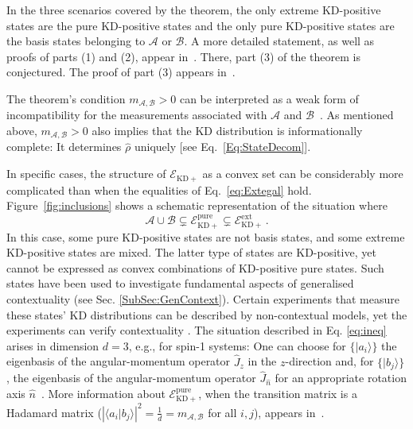 \documentclass[%
 reprint,
superscriptaddress,
nofootinbib,
bibnotes,
 amsmath,amssymb,
 aps,
]{revtex4-1}
\theoremstyle{plain}
\newcommand{\bracket}[2]{\langle #1|#2\rangle}
\newcommand{\Acal}{{\mathcal A}}
\newcommand{\Bcal}{{\mathcal B}}
\newcommand{\EcalKDC}{{\mathcal E}_{\mathrm{KD+}}}
\newcommand{\EcalKDCpu}{{\mathcal E}_{\mathrm{KD+}}^{\mathrm{pure}}}
\newcommand{\EcalKDCext}{{\mathcal E}_{\mathrm{KD+}}^{\mathrm{ext}}}
\newcommand{\mab}{m_{\Acal,\Bcal}}
\begin{document}
In the three scenarios covered by the theorem, the only extreme KD-positive states are the pure KD-positive states and the only pure KD-positive states are the basis states belonging to $\Acal$ or $\Bcal$.  A more detailed statement, as well as proofs of parts (1) and (2), appear in~\cite{langrenez2023characterizing}. There, part (3) of the theorem is conjectured. The proof of part (3) appears in~\cite{ADBLSLT24}.  




The theorem's condition $\mab>0$ can be interpreted as a weak form of incompatibility for the measurements associated with $\Acal$ and $\Bcal$~\cite{debievre2023}.  As mentioned above, $\mab>0$ also implies that the KD distribution is informationally complete: It determines $\hat{\rho}$ uniquely [see Eq.~\eqref{Eq:StateDecom}]. 

In specific cases, the structure of $\EcalKDC$ as a convex set can be considerably more complicated than when the equalities of Eq.~\eqref{eq:Extegal} hold.
Figure~\ref{fig:inclusions} shows a schematic representation of the situation where 
\begin{equation}\label{eq:ineq}
\Acal\cup\Bcal\subsetneq \EcalKDCpu\subsetneq \EcalKDCext \, .
\end{equation}
In this case, some pure KD-positive states are not basis states, and some extreme KD-positive states are mixed.
The latter type of states are KD-positive, yet cannot be expressed as convex combinations of KD-positive pure states.  Such states have been used to investigate fundamental aspects of  generalised contextuality (see Sec. \ref{SubSec:GenContext}). Certain experiments that measure these states' KD distributions can be described by non-contextual models, yet the experiments can verify contextuality \cite{thio2024}.  
The situation described in Eq. \eqref{eq:ineq} arises in dimension $d=3$, e.g., for spin-1 systems: 
One can choose for $\{ |a_i\rangle \} $ the eigenbasis of the angular-momentum operator $\hat{J}_z$ in the $z$-direction and,  for $\{ |b_j\rangle \} $,  the eigenbasis of the  angular-momentum operator $\hat{J}_{\hat n}$ for an appropriate rotation axis $\hat n$~\cite{langrenez2023characterizing}. More information about $\EcalKDCpu$, 
when the transition matrix is a Hadamard matrix ($\left|\bracket{a_i}{b_j}\right|^2 = \frac{1}{d} = \mab$ for all $i,j$), appears in~\cite{DeBievre2021,debievre2023,xu2022b}.
\end{document}

